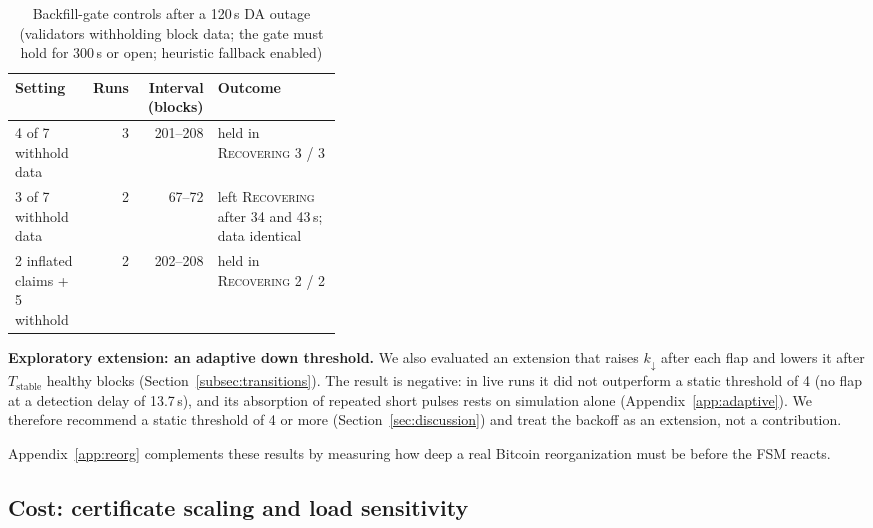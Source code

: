 \begin{table}[tbp]
\caption{Backfill-gate controls after a 120\,s DA outage (validators withholding
block data; the gate must hold for 300\,s or open; heuristic fallback enabled)}
\label{tab:backfill-controls}
\centering
\footnotesize
\begin{tabular}{@{}lrr>{\raggedright\arraybackslash}p{0.38\linewidth}@{}}
\toprule
\textbf{Setting} & \textbf{Runs} & \textbf{Interval (blocks)} & \textbf{Outcome} \\
\midrule
4 of 7 withhold data & 3 & 201--208 & held in \textsc{Recovering} 3 / 3 \\
3 of 7 withhold data & 2 & 67--72 & left \textsc{Recovering} after 34 and 43\,s; data identical \\
2 inflated claims + 5 withhold & 2 & 202--208 & held in \textsc{Recovering} 2 / 2 \\
\bottomrule
\end{tabular}
\end{table}

\textbf{Exploratory extension: an adaptive down threshold.} We also evaluated an
extension that raises $k_{\downarrow}$ after each flap and lowers it after
$T_{\text{stable}}$ healthy blocks (Section~\ref{subsec:transitions}). The result is
negative: in live runs it did not outperform a static threshold of 4 (no flap at a
detection delay of 13.7\,s), and its absorption of repeated short pulses rests on
simulation alone (Appendix~\ref{app:adaptive}). We therefore recommend a static
threshold of 4 or more (Section~\ref{sec:discussion}) and treat the backoff as an
extension, not a contribution.

Appendix~\ref{app:reorg} complements these results by measuring how deep a
real Bitcoin reorganization must be before the FSM reacts.



\subsection*{Cost: certificate scaling and load sensitivity}

